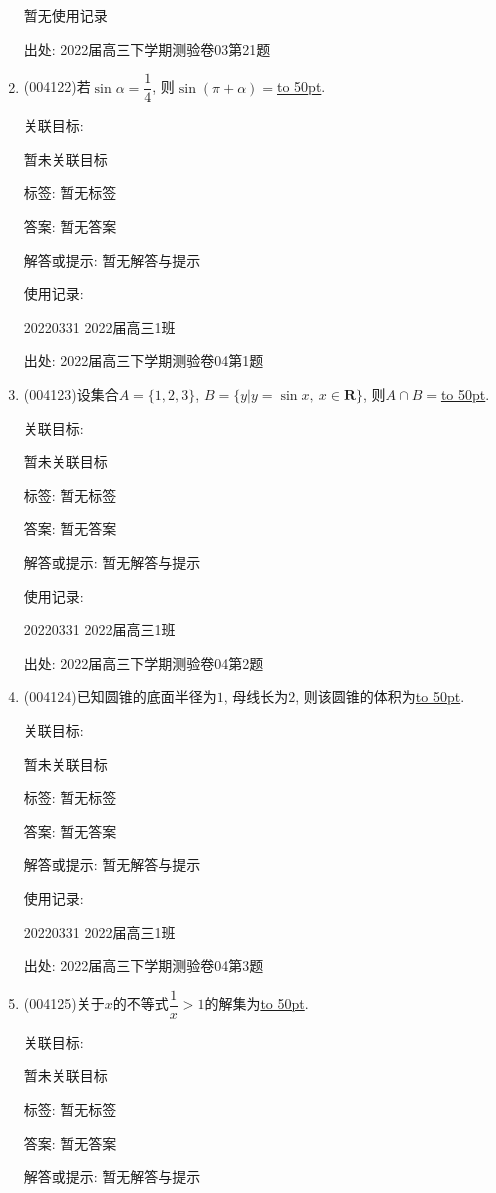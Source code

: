\documentclass[10pt,a4paper]{article}
\newcommand{\blank}[1]{\underline{\hbox to #1pt{}}}
\begin{document}
\begin{enumerate}[1.]
暂无使用记录


出处: 2022届高三下学期测验卷03第21题
\item { (004122)}若$\sin\alpha=\dfrac 14$, 则$\sin(\pi+\alpha)=$\blank{50}.


关联目标:

暂未关联目标



标签: 暂无标签

答案: 暂无答案

解答或提示: 暂无解答与提示

使用记录:

20220331	2022届高三1班	


出处: 2022届高三下学期测验卷04第1题
\item { (004123)}设集合$A=\{1,2,3\}$, $B=\{y|y=\sin x, \ x\in \mathbf{R}\}$, 则$A\cap B=$\blank{50}.


关联目标:

暂未关联目标



标签: 暂无标签

答案: 暂无答案

解答或提示: 暂无解答与提示

使用记录:

20220331	2022届高三1班	


出处: 2022届高三下学期测验卷04第2题
\item { (004124)}已知圆锥的底面半径为$1$, 母线长为$2$, 则该圆锥的体积为\blank{50}.


关联目标:

暂未关联目标



标签: 暂无标签

答案: 暂无答案

解答或提示: 暂无解答与提示

使用记录:

20220331	2022届高三1班	


出处: 2022届高三下学期测验卷04第3题
\item { (004125)}关于$x$的不等式$\dfrac{1}{x}>1$的解集为\blank{50}.


关联目标:

暂未关联目标



标签: 暂无标签

答案: 暂无答案

解答或提示: 暂无解答与提示


\end{enumerate}
\end{document}
